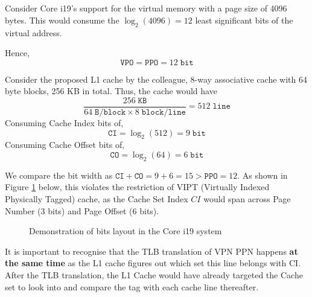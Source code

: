 \documentclass[12pt]{article}
\begin{document}
\section{}

\subsection{}

\subsubsection{}
\label{section:1ai}

Consider Core i19's support for the virtual memory with a page size of 4096 bytes. This would consume the $\log_2(4096) = 12$ least significant bits of the virtual address. 

Hence,
$$\mathtt{VPO = PPO} = 12\; \mathtt{bit}$$

Consider the proposed L1 cache by the colleague, 8-way associative cache with 64 byte blocks, 256 KB in total. Thus, the cache would have
$$ \frac{256\; \mathtt{KB}}{64\; \mathtt{B/block} \times 8 \; \mathtt{block/line}} = 512\; \mathtt{line}$$
Consuming Cache Index bits of,
$$ \mathtt{CI} = \log_2(512) = 9\; \mathtt{bit} $$
Consuming Cache Offset bits of,
$$ \mathtt{CO} = \log_2(64) = 6\; \mathtt{bit} $$

We compare the bit width as $\mathtt{CI + CO} = 9+6=15 > \mathtt{PPO} = 12 $. As shown in Figure \ref{fig:1a} below, this violates the restriction of VIPT (Virtually Indexed Physically Tagged) cache, as the Cache Set Index $CI$ would span across Page Number (3 bits) and Page Offset (6 bits).

\begin{figure}[h!]
  \caption{Demonstration of bits layout in the Core i19 system}
  \label{fig:1a}
\end{figure}

It is important to recognise that the TLB translation of VPN \textrightarrow{} PPN happens \textbf{at the same time} as the L1 cache figures out which set this line belongs with CI. After the TLB translation, the L1 Cache would have already targeted the Cache set to look into and compare the tag with each cache line thereafter.
\end{document}
